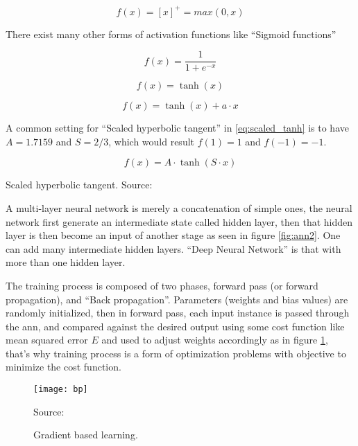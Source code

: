 \begin{equation}
f( x ) = [ x ]^+ = max(0, x)
\label{eq:relu}
\end{equation}

There exist many other forms of activation functions like ``Sigmoid functions''\autocite{orr1998neural}\autocite{lecuniefficient}

\begin{equation}
f( x ) = \frac{ 1 }{ 1+e^{-x} }
\label{eq:tanh}
\end{equation}

\begin{equation}
f( x ) = \tanh(x)
\label{eq:tanh}
\end{equation}

\begin{equation}
f( x ) = \tanh(x) + a\cdot x
\label{eq:tanh_plus_linear}
\end{equation}

A common setting for ``Scaled hyperbolic tangent''\autocite{lecun1989generalization} in \ref{eq:scaled_tanh}
is to have \(A=1.7159\) and \(S=2/3\), which would result \(f(1)=1\) and \(f(-1)=-1\).

\begin{eqfloat}
\begin{equation}
f( x ) = A \cdot \tanh(S\cdot x)
\label{eq:scaled_tanh}
\end{equation}
\caption{Scaled hyperbolic tangent. Source:\autocite{lecun1989generalization}}
\end{eqfloat}

A multi-layer neural network is merely a concatenation of simple ones,
the neural network first generate an intermediate state
called hidden layer, then that hidden layer is then become an input of another stage as seen in figure \ref{fig:ann2}.
One can add many intermediate hidden layers.
``Deep Neural Network'' is that with more than one hidden layer.
 
The training process is composed of two phases, forward pass (or forward propagation), and ``Back propagation''.
Parameters (weights and bias values) are randomly initialized, then in forward pass,
each input instance is passed through the \gls{ann}, and compared against the desired output
using some cost function like mean squared error \(E\)
and used to adjust weights accordingly as in figure \ref{fig:bp},
that's why training process is a form of optimization problems with objective to minimize the cost function.

\begin{figure}[!h]
\centering
\texttt{[image: bp]}
\caption{Gradient based learning.}\label{fig:bp}
{Source: \autocite{lecuniefficient}\autocite{orr1998neural}\hfill}
\end{figure}

